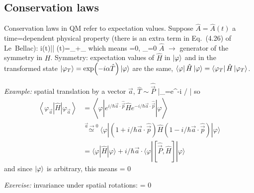\documentclass[12pt]{article}
\begin{document}
\subsection{Conservation laws}

Conservation laws in QM refer to expectation values.
Suppose $\hat{A} = \hat{A}(t)$ a time=dependent physical property
(there is an extra term in Eq.~(4.26) of Le~Bellac):
\be
i\hbar {}\langle\varphi(t)|| \varphi(t)\rangle=\rangle_{\varphi}+\left\langle{}\right\rangle_{\varphi}
\ee
which means
\be
{}=0, \langle{}\rangle_{\varphi}=0 
\ee
$\hat{A}$ $\rightarrow$ generator of the symmetry in $H$.
Symmetry: expectation values of $\hat H$ in $\ket{\varphi}$ and in
the transformed state $\ket{\varphi_T} = \exp(-i\alpha\hat{T})\ket{\varphi}$ are the same, $\bra{\varphi}\hat{H}\ket{\varphi} = \bra{\varphi_T}\hat{H}\ket{\varphi_T}$.

\emph{Example:} spatial translation by a vector $\vec{a}$, $\hat{T} \sim \hat{\vec{P}}$
\be
|\varphi\rangle_{}=e^{-i / \hbar {} \cdot {}}|\varphi\rangle
\ee
so
\[
\begin{aligned}
\left\langle\varphi_{\vec{a}}|\hat{H}| \varphi_{\vec{a}}\right\rangle 
&=\left\langle\varphi\left|e^{i / \hbar \vec{a} \cdot \hat{\vec{p}}} \hat{H} e^{-i / \hbar \vec{a} \cdot \hat{\vec{p}}}\right| \varphi\right\rangle \\ 
& \stackrel{\vec{a} \rightarrow 0}{\simeq}
\langle\varphi|
(1+i / \hbar \vec{a} \cdot \hat{\vec{p}}) \hat{H}
(1-i / \hbar \vec{a} \cdot \hat{\vec{p}})|\varphi\rangle\\
&=\langle\varphi|\hat{H}| \varphi\rangle+i / \hbar \vec{a} \cdot\langle\varphi|[\hat{\vec{P}}, \hat{H}]| \varphi\rangle
\end{aligned}
\]
and since $\ket{\varphi}$ is arbitrary, this means
 = 0
\ee

\emph{Exercise:} invariance under spatial rotations:
 = 0
\ee
\end{document}
